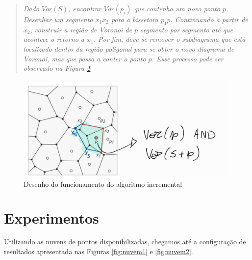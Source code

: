 \documentclass{article}
\begin{document}
\begin{quotation}
  \noindent \textit{Dado $Vor(S)$, encontrar $Vor(p_{i})$ que contenha um novo ponto $p$. Desenhar um segmento $x_{1}x_{2}$ para a bissetora $\overline{p_{1}p}$. Continuando a partir de $x_{2}$, construir a região de Voronoi de $p$ segmento por segmento até que acontece o retorno a $x_{1}$. Por fim, deve-se remover o subdiagrama que está localizado dentro da região poligonal para se obter o novo diagrama de Voronoi, mas que passa a conter o ponto $p$. Esse processo pode ser observado na Figura \ref{fig:incremental}} 
\end{quotation}

\begin{figure}[H]
  \centering
  \includegraphics[scale=0.3]{incremental.png}
  \caption{Desenho do funcionamento do algoritmo incremental}
  \label{fig:incremental}
\end{figure}


\section{Experimentos}

Utilizando as nuvens de pontos disponibilizadas, chegamos até a configuração de resultados apresentada nas Figuras \ref{fig:nuvem1} e \ref{fig:nuvem2}.
\end{document}
